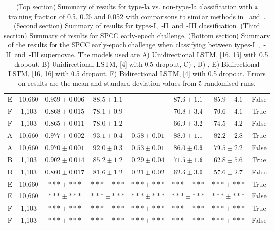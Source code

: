 \documentclass[twocolumn]{aastex61}
\begin{document}
\begin{table}[t!]
\begin{tabular}{ c  c  c  c  c  c  c  c }
E & 10,660 & $0.959 \pm 0.006$ & $88.5 \pm 1.1$ & - & $87.6 \pm 1.1$ & $85.9 \pm 4.1$ & False\\
F & 1,103 & $0.868 \pm 0.015$ & $78.1 \pm 0.9$ & - & $70.8 \pm 3.4$ & $70.6 \pm 4.1$ & True\\
F & 1,103 & $0.865 \pm 0.011$ & $78.0 \pm 1.2$ & - & $66.9 \pm 3.2$ & $74.5 \pm 4.2$ & False\\\hline\hline
A & 10,660 & $0.977 \pm 0.002$ & $93.1 \pm 0.4$ & $0.58 \pm 0.01$ & $88.0 \pm 1.1$ & $82.2 \pm 2.8$ & True\\
A & 10,660 & $0.970 \pm 0.001$ & $92.0 \pm 0.3$ & $0.53 \pm 0.01$ & $86.0 \pm 0.9$ & $79.5 \pm 2.2$ & False\\
B & 1,103 & $0.902 \pm 0.014$ & $85.2 \pm 1.2$ & $0.29 \pm 0.04$ & $71.5 \pm 1.6$ & $62.8 \pm 5.6$ & True\\
B & 1,103 & $0.860 \pm 0.017$ & $81.6 \pm 1.2$ & $0.21 \pm 0.02$ & $62.6 \pm 3.0$ & $57.6 \pm 2.7$ & False\\\hline\hline
E & 10,660 & $*** \pm ***$ & $*** \pm ***$ & $*** \pm ***$ & $*** \pm ***$ & $*** \pm ***$ & True\\
E & 10,660 & $*** \pm ***$ & $*** \pm ***$ & $*** \pm ***$ & $*** \pm ***$ & $*** \pm ***$ & False\\
F & 1,103 & $*** \pm ***$ & $*** \pm ***$ & $*** \pm ***$ & $*** \pm ***$ & $*** \pm ***$ & True\\
F & 1,103 & $*** \pm ***$ & $*** \pm ***$ & $*** \pm ***$ & $*** \pm ***$ & $*** \pm ***$ & False\\\hline\hline
\end{tabular}
\caption{\label{tab:05_SN1a} (Top section) Summary of results for  type-Ia vs. non-type-Ia classification with a training fraction of 0.5, 0.25 and 0.052 with comparisons to similar methods in~\cite{Karpenka:2012pm} and~\cite{Newling:2010bp}. (Second section) Summary of results for types-I,~-II~and~-III classification. (Third section) Summary of results for SPCC early-epoch challenge. (Bottom section) Summary of the results for the SPCC early-epoch challenge when classifying between types-I~,~-II~and~-III supernovae. The models used are A) Unidirectional LSTM, [16, 16] with 0.5 dropout, B) Unidirectional LSTM, [4] with 0.5 dropout, C) \cite{Karpenka:2012pm}, D) \cite{Newling:2010bp}, E) Bidirectional LSTM, [16, 16] with 0.5 dropout, F) Bidirectional LSTM, [4] with 0.5 dropout. Errors on results are the mean and standard deviation values from 5 randomised runs.}
\end{table}
\end{document}
